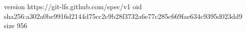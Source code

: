 version https://git-lfs.github.com/spec/v1
oid sha256:a302a0be9916d2144d75cc2c9b28f3732a6e77c285c669fae634c9395d023dd9
size 956
